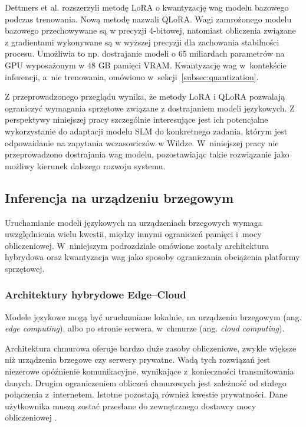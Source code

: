 Dettmers et al. \cite{Dettmers2023} rozszerzyli metodę LoRA o kwantyzację wag modelu bazowego podczas trenowania. Nową metodę nazwali QLoRA. Wagi zamrożonego modelu bazowego przechowywane są w precyzji 4-bitowej, natomiast obliczenia związane z gradientami wykonywane są w wyższej precyzji dla zachowania stabilności procesu. Umożliwia to np. dostrajanie modeli o 65 miliardach parametrów na GPU wyposażonym w 48 GB pamięci VRAM. Kwantyzację wag w~kontekście inferencji, a~nie trenowania, omówiono w~sekcji~\ref{subsec:quantization}.

Z przeprowadzonego przeglądu wynika, że metody LoRA i QLoRA pozwalają ograniczyć wymagania sprzętowe związane z dostrajaniem modeli językowych. Z perspektywy niniejszej pracy szczególnie interesujące jest ich potencjalne wykorzystanie do adaptacji modelu SLM do konkretnego zadania, którym jest odpowaidanie na zapytania wczasowiczów w Wildze. W~niniejszej pracy nie przeprowadzono dostrajania wag modelu, pozostawiając takie rozwiązanie jako możliwy kierunek dalszego rozwoju systemu.

\subsection{Inferencja na urządzeniu brzegowym}
\label{subsec:edge_inf}

Uruchamianie modeli językowych na urządzeniach brzegowych wymaga uwzględnienia wielu kwestii, między innymi ograniczeń pamięci i~mocy obliczeniowej. W~niniejszym podrozdziale omówione zostały architektura hybrydowa oraz kwantyzacja wag jako sposoby ograniczania obciążenia platformy sprzętowej.

\subsubsection{Architektury hybrydowe Edge--Cloud}
\label{subsec:edge_cloud}

Modele językowe mogą być uruchamiane lokalnie, na urządzeniu brzegowym (ang. \emph{edge computing}), albo po stronie serwera, w~chmurze (ang. \emph{cloud computing}).

Architektura chmurowa oferuje bardzo duże zasoby obliczeniowe, zwykle większe niż urządzenia brzegowe czy serwery prywatne. Wadą tych rozwiązań jest niezerowe opóźnienie komunikacyjne, wynikające z~konieczności transmitowania danych. Drugim ograniczeniem obliczeń chmurowych jest zależność od stałego połączenia z~internetem. Istotne pozostają również kwestie prywatności. Dane użytkownika muszą zostać przesłane do zewnętrznego dostawcy mocy obliczeniowej \cite{Renney2026}.

